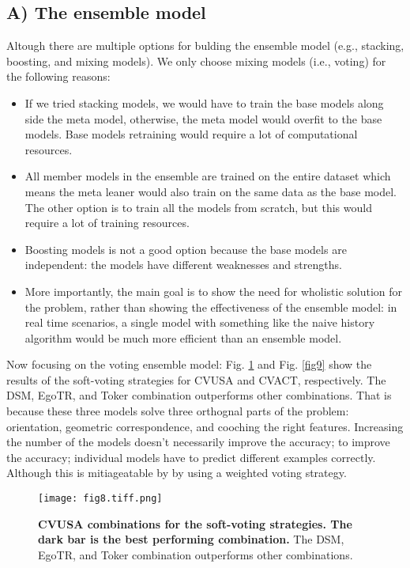 \documentclass[10pt,letterpaper]{article}
\newif\ifhighlight
\newcommand{\hlb}[1]{\ifhighlight{\hl{#1}}\else{#1}\fi}
\begin{document}
\subsection*{A) The ensemble model}
\hlb{Altough there are multiple options for bulding the ensemble model (e.g., stacking, boosting, and mixing models). We only choose mixing models (i.e., voting) for the following reasons:}
\begin{itemize}
  \item \hlb{If we tried stacking models, we would have to train the base models along side the meta model, otherwise, the meta model would overfit to the base models. Base models retraining would require a lot of computational resources.}
  \item \hlb{All member models in the ensemble are trained on the entire dataset which means the meta leaner would also train on the same data as the base model. The other option is to train all the models from scratch, but this would require a lot of training resources.}
  \item \hlb{Boosting models is not a good option because the base models are independent: the models have different weaknesses and strengths.}
  \item \hlb{More importantly, the main goal is to show the need for wholistic solution for the problem, rather than showing the effectiveness of the ensemble model: in real time scenarios, a single model with something like the naive history algorithm would be much more efficient than an ensemble model.}
\end{itemize}
\hlb{Now focusing on the voting ensemble model: } \hlb{Fig.} \ref{fig8} and \hlb{Fig.} \ref{fig9} show the results of the soft-voting strategies for CVUSA and CVACT, respectively. The DSM, EgoTR, and Toker combination outperforms other combinations. \hlb{That is because these three models solve three orthognal parts of the problem: orientation, geometric correspondence, and cooching the right features.}  Increasing the number of the models doesn’t necessarily improve the accuracy; to improve the accuracy; individual models have to predict different examples correctly. \hlb{Although this is mitiageatable by by using a weighted voting strategy.}

\begin{figure}[!ht]
  \caption{{\bf CVUSA combinations for the soft-voting strategies. The dark bar is the best performing combination.} The DSM, EgoTR, and Toker combination outperforms other combinations.}
  \texttt{[image: fig8.tiff.png]}
  
  \label{fig8}
\end{figure}
\end{document}
